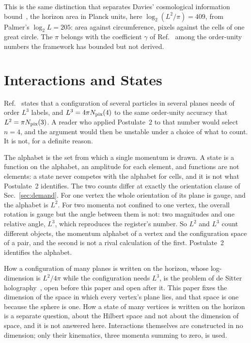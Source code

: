 \documentclass[aps,prd,twocolumn,superscriptaddress,nofootinbib]{revtex4-2}
\begin{document}
This is the same distinction that separates Davies' cosmological information bound~\cite{davies2007}, the horizon area in Planck units, here $\log_2(L^2/\pi) = 409$, from Palmer's $\log_2 L = 205$: area against circumference, pixels against the cells of one great circle. The $\pi$ belongs with the coefficient $\gamma$ of Ref.~\cite{korytko2026} among the order-unity numbers the framework has bounded but not derived.

\section{Interactions and States}
\label{sec:states}

Ref.~\cite{korytko2026c} states that a configuration of several particles in several planes needs of order $L^3$ labels, and $L^3 = 4\pi N_{\rm pix}(4)$ to the same order-unity accuracy that $L^2 = \pi N_{\rm pix}(3)$. A reader who applied Postulate~2 to that number would select $n = 4$, and the argument would then be unstable under a choice of what to count. It is not, for a definite reason.

The alphabet is the set from which a single momentum is drawn. A state is a function on the alphabet, an amplitude for each element, and functions are not elements: a state never competes with the alphabet for cells, and it is not what Postulate~2 identifies. The two counts differ at exactly the orientation clause of Sec.~\ref{sec:demand}. For one vertex the whole orientation of its plane is gauge, and the alphabet is $L^2$. For two momenta not confined to one vertex, the overall rotation is gauge but the angle between them is not: two magnitudes and one relative angle, $L^3$, which reproduces the register's number. So $L^2$ and $L^3$ count different objects, the momentum alphabet of a vertex and the configuration space of a pair, and the second is not a rival calculation of the first. Postulate~2 identifies the alphabet.

How a configuration of many planes is written on the horizon, whose log-dimension is $L^2/4\pi$ while the configuration needs $L^3$, is the problem of de Sitter holography~\cite{bousso1999,banksfischler2001,parikh2003}, open before this paper and open after it. This paper fixes the dimension of the space in which every vertex's plane lies, and that space is one because the sphere is one. How a state of many vertices is written on the horizon is a separate question, about the Hilbert space and not about the dimension of space, and it is not answered here. Interactions themselves are constructed in no dimension; only their kinematics, three momenta summing to zero, is used.
\end{document}
